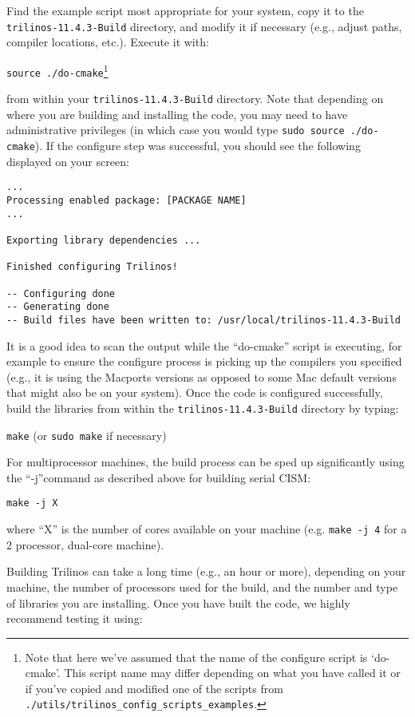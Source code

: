 Find the example script most appropriate for your system, copy it to the \texttt{trilinos-11.4.3-Build} directory, and modify it if necessary (e.g., adjust paths, compiler locations, etc.).
Execute it with: 

\texttt{source ./do-cmake}\footnote{Note that here we've assumed that the name of the configure script is `do-cmake'. This script name may differ depending on what you have called it or if you've copied and modified one of the scripts from \texttt{./utils/trilinos\_config\_scripts\_examples}.}

from within your \texttt{trilinos-11.4.3-Build} directory. Note that depending on where you are building and installing the code, you may need to have administrative privileges (in which case you would type \texttt{sudo source ./do-cmake}). If the configure step was successful, you should see the following displayed on your screen:

\begin{verbatim}
...
Processing enabled package: [PACKAGE NAME]
...

Exporting library dependencies ...

Finished configuring Trilinos!

-- Configuring done
-- Generating done
-- Build files have been written to: /usr/local/trilinos-11.4.3-Build
\end{verbatim}

It is a good idea to scan the output while the ``do-cmake'' script is executing, 
for example to ensure the configure process is picking up the compilers you specified 
(e.g., it is using the Macports versions as opposed to some Mac default versions that 
might also be on your system). Once the code is configured successfully, build the libraries 
from within the \texttt{trilinos-11.4.3-Build} directory by typing:

\texttt{make} (or \texttt{sudo make} if necessary) 

For multiprocessor machines, the build process can be sped up significantly using 
the ``-j''command as described above for building serial CISM:

\texttt{make -j X}

where ``X'' is the number of cores available on your machine (e.g. \texttt{make -j 4} 
for a 2 processor, dual-core machine).

Building Trilinos can take a long time (e.g., an hour or more), depending on your machine, 
the number of processors used for the build, and the number and type of libraries 
you are installing. Once you have built the code, we highly recommend testing it 
using:


